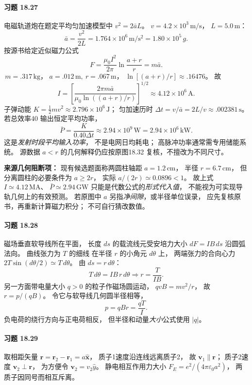 \paragraph{习题 18.27}
电磁轨道炮在题定平均匀加速模型中
\(v^2=2\bar aL\)。
\(v=4.2\times10^3\,\mathrm{m/s}\)，
\(L=5.0\,\mathrm m\)：
\[
 \boxed{\bar a=\frac{v^2}{2L}
 =1.764\times10^6\,\mathrm{m/s^2}
 =1.80\times10^5\,g}.
\]
按源书给定近似磁力公式
\[
 F=\frac{\mu_0I^2}{2\pi}
 \ln\frac{a+r}{r}=m\bar a.
\]
\(\,m=.317\,\mathrm{kg}\)，
\(a=.012\,\mathrm m,\ r=.067\,\mathrm m\)，
\(\ln[(a+r)/r]\approx.16476\)。
故
\[
 \boxed{I=\left[\frac{2\pi m\bar a}
 {\mu_0\ln((a+r)/r)}\right]^{1/2}
 \approx4.12\times10^6\,\mathrm A}.
\]
子弹动能
\(K=\frac12mv^2\approx2.796\times10^6\,\mathrm J\)；
匀加速历时
\(\Delta t=v/\bar a=2L/v\approx.002381\,\mathrm s\)。
若总效率40%
输出恒定平均功率，
\[
 \boxed{\bar P=\frac{K}{0.40\Delta t}
 \approx2.94\times10^9\,\mathrm W
 =2.94\times10^6\,\mathrm{kW}}.
\]
这是\emph{发射时段平均输入功率}，
不是电网日均耗电；
高脉冲功率通常需专用储能系统。
源数据 \(a<r\) 的几何解释仍应按原图18.32
复核，不擅改为不同尺寸。

\textbf{来源几何阻断项：}
现有候选题面称两圆柱轴距 \(a=1.2\,\mathrm{cm}\)，
半径 \(r=6.7\,\mathrm{cm}\)，
但分离圆柱的必要条件为 \(a\ge 2r\)，
实际 \(a/(2r)\simeq0.0896<1\)。
故上式 \(I\simeq4.12\,\mathrm{MA}\)、
\(\bar P\simeq2.94\,\mathrm{GW}\)
只能是代数公式的\emph{形式代入值}，
不能视为可实现导轨几何上的有效预测。
若原图中 \(a\) 另指\emph{净间隙}，或半径单位误录，
应先复核原书，再重新计算磁力积分；
不可自行猜改数值。


\paragraph{习题 18.28}
磁场垂直软导线所在平面，
长度 \(ds\) 的载流线元受安培力大小
\(dF=IB\,ds\) 沿圆弧法向。
曲线张力为 \(T\) 的细线
在半径 \(r\) 的小角元 \(d\theta\) 上，
两端张力的合向心力
\(2T\sin(d\theta/2)\simeq T\,d\theta\)。
由 \(ds=r\,d\theta\)：
\[
 T\,d\theta=IB\,r\,d\theta
 \Longrightarrow
 \boxed{r=\frac{T}{IB}}.
\]
另一方面带电量大小 \(q>0\)
的粒子作磁场圆运动，
\(qvB=mv^2/r\)，
故 \(r=p/(qB)\)。
令它与软导线几何圆半径相等，
\[
 \boxed{p=qBr=\frac{qT}{I}}.
\]
负电荷的绕行方向与正电荷相反，
但半径和动量\emph{大小}公式使用 \(|q|\)。

\paragraph{习题 18.29}
取相距矢量
\(\boldsymbol r=\boldsymbol r_2-\boldsymbol r_1
 =a\hat{\boldsymbol x}\)，
质子1速度沿连线远离质子2，
故 \(\boldsymbol v_1\parallel\boldsymbol r\)；
质子2速度
\(\boldsymbol v_2\perp\boldsymbol r\)，
为方便令 \(\boldsymbol v_2=v_2\hat y\)。
静电相互作用力大小
\(F_E=e^2/(4\pi\varepsilon_0a^2)\)，
两质子因同号而相互斥离。

